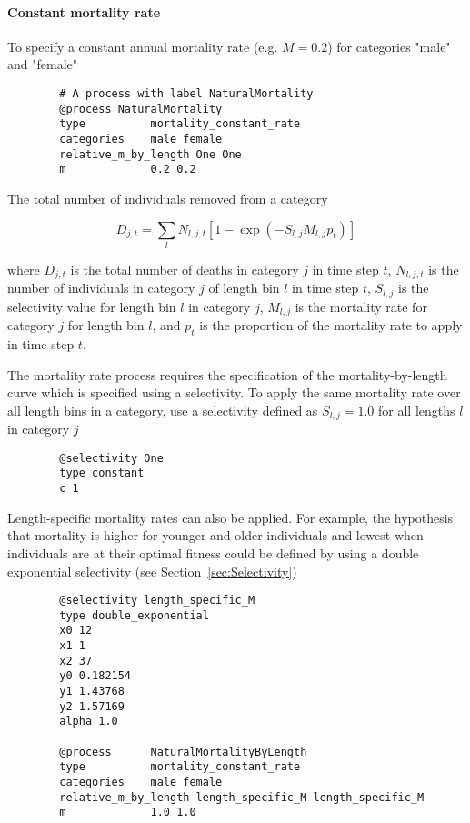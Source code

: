 \paragraph{Constant mortality rate}\label{sec:Process-Length-MortalityConstantRate} 

To specify a constant annual mortality rate (e.g. $M=0.2$) for categories "male" and "female"
{\small{\begin{verbatim}
		# A process with label NaturalMortality
		@process NaturalMortality
		type          mortality_constant_rate
		categories    male female
		relative_m_by_length One One
		m             0.2 0.2
		\end{verbatim}}}

The total number of individuals removed from a category

\begin{equation}
D_{j,t} = \sum_l N_{l,j,t} [1 - \exp(-S_{l,j} M_{l,j} p_t)]
\end{equation}

where $D_{j,t}$ is the total number of deaths in category $j$ in time step $t$, $N_{l,j,t}$ is the number of individuals in category $j$ of length bin $l$ in time step $t$, $S_{l,j}$ is the selectivity value for length bin $l$ in category $j$, $M_{l,j}$ is the mortality rate for category $j$ for length bin $l$, and $p_t$ is the proportion of the mortality rate to apply in time step $t$.

The mortality rate process requires the specification of the mortality-by-length curve which is specified using a selectivity. To apply the same mortality rate over all length bins in a category, use a selectivity defined as $S_{l,j}=1.0$ for all lengths $l$ in category $j$

{\small{\begin{verbatim}
		@selectivity One
		type constant
		c 1
		\end{verbatim}}}

Length-specific mortality rates can also be applied. For example, the hypothesis that mortality is higher for younger and older individuals and lowest when individuals are at their optimal fitness could be defined by using a double exponential selectivity (see Section~\ref{sec:Selectivity})

{\small{\begin{verbatim}
		@selectivity length_specific_M
		type double_exponential
		x0 12
		x1 1
		x2 37
		y0 0.182154
		y1 1.43768
		y2 1.57169
		alpha 1.0
		
		@process      NaturalMortalityByLength
		type          mortality_constant_rate
		categories    male female
		relative_m_by_length length_specific_M length_specific_M
		m             1.0 1.0
		\end{verbatim}}}


